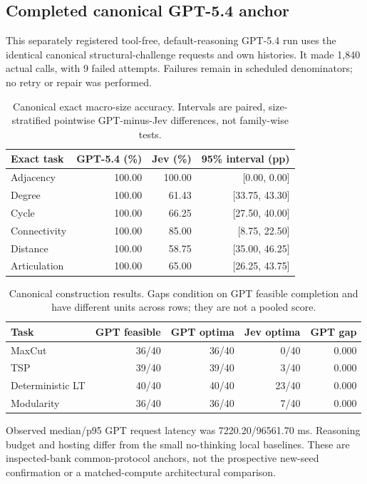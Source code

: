 \subsection{Completed canonical GPT-5.4 anchor}
This separately registered tool-free, default-reasoning GPT-5.4 run uses
the identical canonical structural-challenge requests and own histories.
It made 1,840 actual calls, with 9 failed attempts.
Failures remain in scheduled denominators; no retry or repair was performed.
\begin{table}[ht]\centering\small
\begin{tabular}{lrrr}
\toprule
Exact task & GPT-5.4 (\%) & Jev (\%) & 95\% interval (pp) \\
\midrule
Adjacency & 100.00 & 100.00 & [0.00, 0.00] \\
Degree & 100.00 & 61.43 & [33.75, 43.30] \\
Cycle & 100.00 & 66.25 & [27.50, 40.00] \\
Connectivity & 100.00 & 85.00 & [8.75, 22.50] \\
Distance & 100.00 & 58.75 & [35.00, 46.25] \\
Articulation & 100.00 & 65.00 & [26.25, 43.75] \\
\bottomrule
\end{tabular}

\caption{Canonical exact macro-size accuracy. Intervals are paired,
size-stratified pointwise GPT-minus-Jev differences, not family-wise tests.}
\end{table}
\begin{table}[ht]\centering\small
\begin{tabular}{lrrrr}
\toprule
Task & GPT feasible & GPT optima & Jev optima & GPT gap \\
\midrule
MaxCut & 36/40 & 36/40 & 0/40 & 0.000 \\
TSP & 39/40 & 39/40 & 3/40 & 0.000 \\
Deterministic LT & 40/40 & 40/40 & 23/40 & 0.000 \\
Modularity & 36/40 & 36/40 & 7/40 & 0.000 \\
\bottomrule
\end{tabular}

\caption{Canonical construction results. Gaps condition on GPT feasible
completion and have different units across rows; they are not a pooled score.}
\end{table}
Observed median/p95 GPT request latency was 7220.20/96561.70 ms.
Reasoning budget and hosting differ from the small no-thinking local baselines.
These are inspected-bank common-protocol anchors, not the prospective new-seed
confirmation or a matched-compute architectural comparison.
